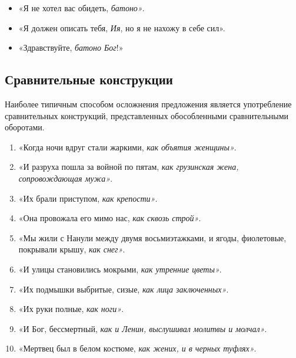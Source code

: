 \documentclass{kursa4}
\begin{document}
{{\begin{enumerate}
          \begin{itemize}
            \item «Я не хотел вас обидеть, \textit{батоно»}.
            \item «Я должен описать тебя, \textit{Ия}, но я не нахожу в себе сил».
            \item «Здравствуйте, \textit{батоно Бог}!»
          \end{itemize}
        \end{enumerate}

      \subsection{Сравнительные конструкции}
      Наиболее типичным способом осложнения предложения является употребление сравнительных конструкций, представленных обособленными сравнительными оборотами.
      \begin{enumerate}
          \item «Когда ночи вдруг стали жаркими, \textit{как объятия женщины»}.
          \item «И разруха пошла за войной по пятам, \textit{как грузинская жена, сопровождающая мужа»}.
          \item «Их брали приступом, \textit{как крепости»}.
          \item «Она провожала его мимо нас, \textit{как сквозь строй»}.
          \item «Мы жили с Нанули между двумя восьмиэтажками, и ягоды, фиолетовые, покрывали крышу, \textit{как снег»}.
          \item «И улицы становились мокрыми, \textit{как утренние цветы»}.
          \item «Их подмышки выбритые, сизые, \textit{как лица заключенных»}.
          \item «Их руки полные, \textit{как ноги»}.
          \item «И Бог, бессмертный, \textit{как и Ленин, выслушивал молитвы и молчал»}.
          \item «Мертвец был в белом костюме, \textit{как жених, и в черных туфлях»}.
      \end{enumerate}

}}
\end{document}
